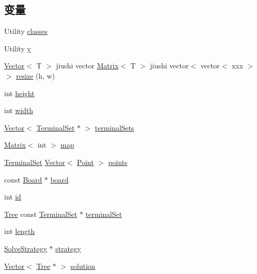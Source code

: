 \subsection*{变量}
\begin{DoxyCompactItemize}
\item 
Utility \hyperlink{classes_8txt_ad6cc41fabb67cb459387b9c9375f4aff}{classes}
\item 
Utility \hyperlink{classes_8txt_a52673b1e0cce0104e52dcd12727f211e}{y}
\item 
\hyperlink{classVector}{Vector}$<$ T $>$ jiushi vector \hyperlink{classMatrix}{Matrix}$<$ T $>$ jiushi vector$<$ vector$<$ xxx $>$ $>$ \hyperlink{classes_8txt_a91bb0844819b55afa331ca2a41d77b64}{resize} (h, w)
\item 
int \hyperlink{classes_8txt_ad12fc34ce789bce6c8a05d8a17138534}{height}
\item 
int \hyperlink{classes_8txt_a2474a5474cbff19523a51eb1de01cda4}{width}
\item 
\hyperlink{classVector}{Vector}$<$ \hyperlink{classTerminalSet}{Terminal\+Set} $\ast$ $>$ \hyperlink{classes_8txt_aefc745d101147acb2777430132833faf}{terminal\+Sets}
\item 
\hyperlink{classMatrix}{Matrix}$<$ int $>$ \hyperlink{classes_8txt_a0a12e395730487ab04f7f11cbc4d2132}{map}
\item 
\hyperlink{classTerminalSet}{Terminal\+Set} \hyperlink{classVector}{Vector}$<$ \hyperlink{classPoint}{Point} $>$ \hyperlink{classes_8txt_ae368e6252d0add75ea011d5d90db68ed}{points}
\item 
const \hyperlink{classBoard}{Board} $\ast$ \hyperlink{classes_8txt_ab2104b75e0965a7c5fc13208045d9b59}{board}
\item 
int \hyperlink{classes_8txt_a7441ef0865bcb3db9b8064dd7375c1ea}{id}
\item 
\hyperlink{classTree}{Tree} const \hyperlink{classTerminalSet}{Terminal\+Set} $\ast$ \hyperlink{classes_8txt_a597568d74a60fa533165215be11d5f0b}{terminal\+Set}
\item 
int \hyperlink{classes_8txt_a9f59b34b1f25fe00023291b678246bcc}{length}
\item 
\hyperlink{classSolveStrategy}{Solve\+Strategy} $\ast$ \hyperlink{classes_8txt_a849eb63b7a4e1c3628d4d0e94b9d8aed}{strategy}
\item 
\hyperlink{classVector}{Vector}$<$ \hyperlink{classTree}{Tree} $\ast$ $>$ \hyperlink{classes_8txt_aa43d5190bbc491d9c9134146e01a248e}{solution}
\end{DoxyCompactItemize}



